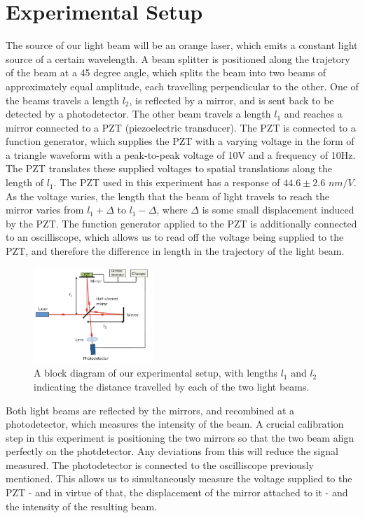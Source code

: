   \section{Experimental Setup}
  The source of our light beam will be an orange laser, which emits a constant light source of a certain wavelength. A beam splitter is positioned along the trajetory of the beam at a 45 degree angle, which splits the beam into two beams of approximately equal amplitude, each travelling perpendicular to the other. One of the beams travels a length $l_2$, is reflected by a mirror, and is sent back to be detected by a photodetector. The other beam travels a length $l_1$ and reaches a mirror connected to a PZT (piezoelectric transducer). The PZT is connected to a function generator, which supplies the PZT with a varying voltage in the form of a triangle waveform with a peak-to-peak voltage of 10V and a frequency of 10Hz. The PZT translates these supplied voltages to spatial translations along the length of $l_1$. The PZT used in this experiment has a response of $44.6 \pm 2.6$ $nm/V$. As the voltage varies, the length that the beam of light travels to reach the mirror varies from $l_1 + \Delta$ to $l_1 - \Delta$, where $\Delta$ is some small displacement induced by the PZT. The function generator applied to the PZT is additionally connected to an oscilliscope, which allows us to read off the voltage being supplied to the PZT, and therefore the difference in length in the trajectory of the light beam.
  \\
  \begin{figure}[t]
    \includegraphics[width=0.4\textwidth]{setup.png}
    \caption{A block diagram of our experimental setup, with lengths $l_1$ and $l_2$ indicating the distance travelled by each of the two light beams. \cite{michelsonmanual}}
  \end{figure}
  Both light beams are reflected by the mirrors, and recombined at a photodetector, which measures the intensity of the beam. A crucial calibration step in this experiment is positioning the two mirrors so that the two beam align perfectly on the photdetector. Any deviations from this will reduce the signal measured. The photodetector is connected to the oscilliscope previously mentioned. This allows us to simultaneously measure the voltage supplied to the PZT - and in virtue of that, the displacement of the mirror attached to it - and the intensity of the resulting beam.

